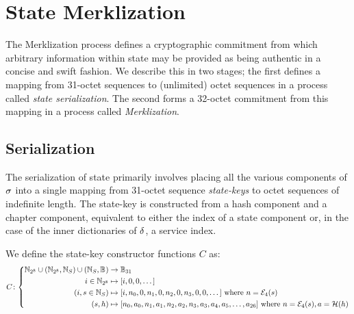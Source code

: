 \section{State Merklization}\label{sec:statemerklization}

The Merklization process defines a cryptographic commitment from which arbitrary information within state may be provided as being authentic in a concise and swift fashion. We describe this in two stages; the first defines a mapping from 31-octet sequences to (unlimited) octet sequences in a process called \emph{state serialization}. The second forms a 32-octet commitment from this mapping in a process called \emph{Merklization}.

\subsection{Serialization}

The serialization of state primarily involves placing all the various components of $\sigma$ into a single mapping from 31-octet sequence \emph{state-keys} to octet sequences of indefinite length. The state-key is constructed from a hash component and a chapter component, equivalent to either the index of a state component or, in the case of the inner dictionaries of $\delta$, a service index.

We define the state-key constructor functions $C$ as:
\begin{equation}
  C\colon\abracegroup{
    \Nbits{8} \cup \tup{\Nbits{8}, \serviceid} \cup \tup{\serviceid, \blob} &\to \blob[31] \\
    i \in \Nbits{8} &\mapsto \sq{i, 0, 0, \dots} \\
    \tup{i, s \in \serviceid} &\mapsto \sq{i, n_0, 0, n_1, 0, n_2, 0, n_3, 0, 0, \dots}\ \where n = \encode[4]{s} \\
    \tup{s, h} &\mapsto \sq{n_0, a_0, n_1, a_1, n_2, a_2, n_3, a_3, a_4, a_5, \dots, a_{26}}\ \where n = \encode[4]{s}, a = \blake{h}
  }
\end{equation}

